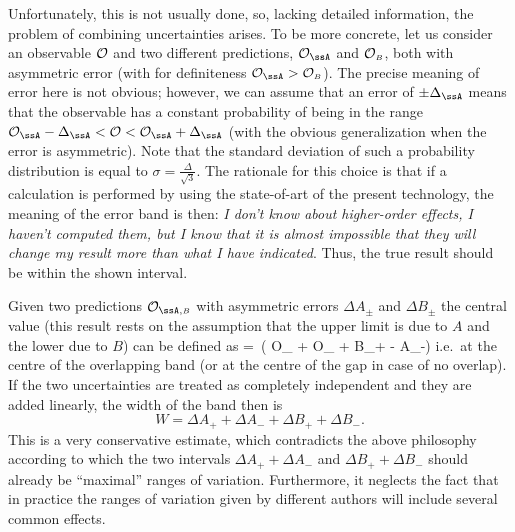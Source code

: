 Unfortunately, this is not usually done, so, lacking 
detailed information, the problem of combining uncertainties arises.
To be more concrete, let us consider an observable ${\cal O}$ and two different 
predictions, ${\cal O}_{\ssA}$ and ${\cal O}_{{\scriptscriptstyle{B}}}$, both with asymmetric 
error (with for definiteness ${\cal O}_{\ssA}>{\cal O}_{\ssB}$). The precise 
meaning of error here is not obvious; however, we can assume that
an error of $\pm\Delta_{\ssA}$ means that the observable has a constant
probability of being in the range ${\cal O}_{\ssA}-\Delta_{\ssA} < {\cal O} <
{\cal O}_{\ssA}+\Delta_{\ssA}$ (with the obvious generalization when the error is
asymmetric). 
Note that the standard deviation of such a probability
distribution is equal to $\sigma=\frac{\Delta}{\sqrt{3}}$.
The rationale for this choice is that if a calculation is performed by using the 
state-of-art of the present technology, the meaning of the error band
is then: {\em I don't know about higher-order 
effects, I haven't computed them, but I know that it is almost impossible 
that they will change my result more than what I have indicated}. Thus, the true 
result should be within the shown interval.

Given two predictions ${\cal O}_{\ssA,\ssB}$ with asymmetric errors
$\Delta A_{\pm}$ and $\Delta B_{\pm}$ the central value (this result rests on the 
assumption that the upper limit is due to $A$ and the lower due to $B$) can be defined 
as
\bq
{}\rangle = \,\Bigl( {\cal O}_{\ssA} + {\cal O}_{\ssB} 
+ \Delta B_+ - \Delta A_-\Bigr)
\label{bestcenter}
\eq
i.e.\ at the centre of the overlapping band (or at the centre of the gap in case
of no overlap). If the two uncertainties
are treated as completely independent and they are added linearly, the
width of the band then is 
\begin{equation}
W= \Delta A_+ + \Delta A_- + \Delta B_+ + \Delta B_-.
\label{bigband}
\end{equation}
This is a very conservative estimate, which contradicts
the above philosophy according to which the two intervals 
$\Delta A_+ + \Delta A_-$ and $\Delta B_+ + \Delta B_-$ should already 
be ``maximal'' ranges of variation. Furthermore, it neglects the fact that 
in practice the ranges of variation given by
different authors will include several common effects. 

